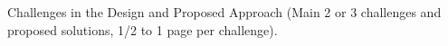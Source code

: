 Challenges in the Design and Proposed Approach (Main 2 or 3 challenges and proposed solutions, 1/2 to 1 page per challenge).
